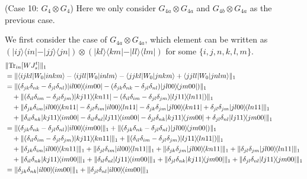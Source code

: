 \documentclass[a4paper,twocolumn,accepted=2022-10-23]{quantumarticle}
\newcommand{\bra}[1]{\langle {#1} \vert}
\newcommand{\ket}[1]{\vert {#1} \rangle}
\newcommand{\ketbra}[2]{\vert {#1} \rangle\!\langle {#2} \vert}
\newcommand{\Tr}[0]{{\mathrm{Tr}}}
\theoremstyle{definition}
\begin{document}
(Case 10: $G_4 \otimes G_4$) \quad
Here we only consider $G_{4a} \otimes G_{4a}$ and $G_{4b} \otimes G_{4a}$ as the previous case.

We first consider the case of $G_{4a} \otimes G_{4a}$, which element can be written as
$(\ketbra{ij}{in} - \ketbra{jj}{jn}) \otimes (\ketbra{kl}{km} - \ketbra{ll}{lm} )$ for some $\{i,j,n,k,l,m\}$.
\begin{align}
& \| \Tr_{in} [W J_s^t] \|_1 \notag \\
&= \| \bra{ijkl} {W_0} \ket{inkm} - \bra{ijll} {W_0} \ket{inlm} - \bra{jjkl} {W_0} \ket{jnkm} + \bra{jjll} {W_0} \ket{jnlm} \|_1 \\
%
&=  \| (\delta_{jk}\delta_{nk} - \delta_{jl}\delta_{nl}) \ketbra{il00}{im00}
- (\delta_{jk}\delta_{nk} - \delta_{jl}\delta_{nl}) \ketbra{jl00}{jm00}) \|_1 \notag \\
&\quad + \| (\delta_{il}\delta_{im} -\delta_{jl}\delta_{jm}) \ketbra{kj11}{kn11}
- (\delta_{il}\delta_{im} - \delta_{jl}\delta_{jm}) \ketbra{lj11}{ln11}) \|_1 \notag \\
&\quad + \| \delta_{jk}\delta_{im} \ketbra{il00}{kn11} - \delta_{jl}\delta_{im} \ketbra{il00}{ln11}
-\delta_{jk}\delta_{jm} \ketbra{jl00}{kn11} + \delta_{jl}\delta_{jm} \ketbra{jl00}{ln11} \|_1 \notag \\
&\quad + \| \delta_{il}\delta_{nk} \ketbra{kj11}{im00} - \delta_{il}\delta_{nl} \ketbra{lj11}{im00}
-\delta_{jl}\delta_{nk} \ketbra{kj11}{jm00} + \delta_{jl}\delta_{nl} \ketbra{lj11}{jm00} \|_1 \\
%
&=  \| (\delta_{jk}\delta_{nk} - \delta_{jl}\delta_{nl}) \ketbra{il00}{im00} \|_1
+ \| (\delta_{jk}\delta_{nk} - \delta_{jl}\delta_{nl}) \ketbra{jl00}{jm00}) \|_1 \notag \\
&\quad + \| (\delta_{il}\delta_{im} -\delta_{jl}\delta_{jm}) \ketbra{kj11}{kn11} \|_1
+ \| (\delta_{il}\delta_{im} - \delta_{jl}\delta_{jm}) \ketbra{lj11}{ln11}) \|_1 \notag \\
&\quad + \| \delta_{jk}\delta_{im} \ketbra{il00}{kn11} \|_1 + \| \delta_{jl}\delta_{im} \ketbra{il00}{ln11} \|_1
+ \| \delta_{jk}\delta_{jm} \ketbra{jl00}{kn11} \|_1 + \| \delta_{jl}\delta_{jm} \ketbra{jl00}{ln11} \|_1 \notag \\
&\quad + \| \delta_{il}\delta_{nk} \ketbra{kj11}{im00} \|_1 + \| \delta_{il}\delta_{nl} \ketbra{lj11}{im00} \|_1
+ \| \delta_{jl}\delta_{nk} \ketbra{kj11}{jm00} \|_1 + \| \delta_{jl}\delta_{nl} \ketbra{lj11}{jm00} \|_1 \\
%
&=  \| \delta_{jk}\delta_{nk} \ketbra{il00}{im00} \|_1 + \| \delta_{jl}\delta_{nl} \ketbra{il00}{im00} \|_1

\end{align}
\end{document}
